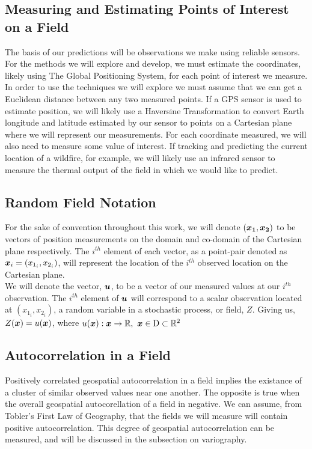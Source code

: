 \documentclass[11pt]{ucthesis}
\newcommand{\vect}[1]{{\it{\boldsymbol{#1}}}}
\begin{document}
\subsection{Measuring and Estimating Points of Interest on a Field}
The basis of our predictions will be observations we make using reliable sensors. For the methods we will explore and develop, we must estimate the coordinates, likely using The Global Positioning System, for each point of interest we measure. In order to use the techniques we will explore we must assume that we can get a Euclidean distance between any two measured points. If a GPS sensor is used to estimate position, we will likely use a Haversine Transformation to convert Earth longitude and latitude estimated by our sensor to points on a Cartesian plane where we will represent our measurements. For each coordinate measured, we will also need to measure some value of interest. If tracking and predicting the current location of a wildfire, for example, we will likely use an infrared sensor to measure the thermal output of the field in which we would like to predict.\\

\subsection{Random Field Notation}
For the sake of convention throughout this work, we will denote $(\vect{x_1}, \vect{x_2})$ to be vectors of position measurements on the domain and co-domain of the Cartesian plane respectively. The $i^{th}$ element of each vector, as a point-pair denoted as $\vect{x}_i = (x_{1_i}, x_{2_i})$, will represent the location of the $i^{th}$ observed location on the Cartesian plane.\\
We will denote the vector, $\vect{u}$, to be a vector of our measured values at our $i^{th}$ observation. The $i^{th}$ element of $\vect{u}$ will correspond to a scalar observation located at $(x_{1_i}, x_{2_i})$, a random variable in a stochastic process, or field, $Z$. Giving us, $Z(\vect{x})=u(\vect{x})$, where $u(\vect{x}): \vect{x} \rightarrow \mathbb{R},\ \vect{x} \in \rm{D} \subset \mathbb{R}^2$\\

\subsection{Autocorrelation in a Field}
Positively correlated geospatial autocorrelation in a field implies the existance of a cluster of similar observed values near one another. The opposite is true when the overall geospatial autocorellation of a field in negative. We can assume, from Tobler's First Law of Geography, that the fields we will measure will contain positive autocorrelation. This degree of geospatial autocorrelation can be measured, and will be discussed in the subsection on variography.
\end{document}
